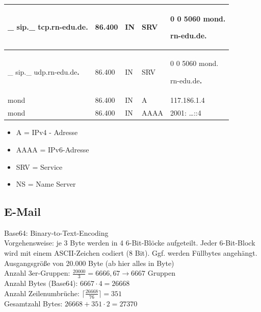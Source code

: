 \begin{enumerate}
\begin{tabularx}{\textwidth}{|X|X|X|X|X|}
	\hline
	\_ sip.\_ tcp.rn-edu.de\textbf{.} &86.400 &IN &SRV &0 0 5060 mond.\par rn-edu.de\textbf{.}\\
	\hline
	\_ sip.\_ udp.rn-edu.de\textbf{.} &86.400 &IN &SRV &0 0 5060 mond.\par rn-edu.de\textbf{.}\\
	\hline
	mond & 86.400 &IN &A&117.186.1.4\\
	\hline
	mond & 86.400 &IN &AAAA &2001: \ldots ::4\\
	\hline
	\end{tabularx}
	\begin{itemize}
	\item A = IPv4 - Adresse
	\item AAAA = IPv6-Adresse
	\item SRV = Service
	\item NS = Name Server
	\end{itemize}
\end{enumerate}
\subsection{E-Mail}
Base64: Binary-to-Text-Encoding\\
Vorgehensweise: je 3 Byte werden in 4 6-Bit-Blöcke aufgeteilt. Jeder 6-Bit-Block wird mit einem ASCII-Zeichen codiert (8 Bit). Ggf. werden Füllbytes angehängt.\\
Ausgangsgröße von 20.000 Byte (ab hier alles in Byte)\\
Anzahl 3er-Gruppen: $\frac{20000}{3} = 6666,67 \to 6667$ Gruppen\\
Anzahl Bytes (Base64): $6667 \cdot 4 = 26668$\\
Anzahl Zeilenumbrüche: $\lceil \frac{26668}{76} \rceil = 351$\\
Gesamtzahl Bytes: $26668 + 351 \cdot 2 = 27370$

